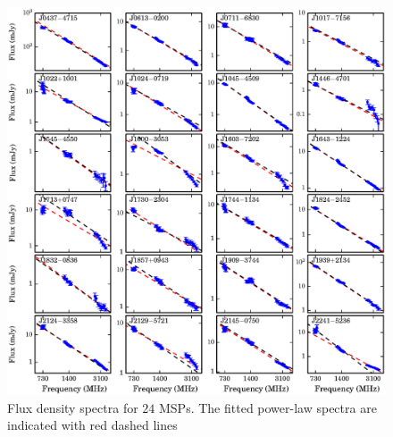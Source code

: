 \documentclass[useAMS,usenatbib]{mn2e}
\begin{document}
\begin{table}
\begin{tabular}{lccccccc}
\hline
\end{tabular}
\end{table}

\begin{figure}
\begin{center}
\includegraphics[width=6 in]{specIndex.ps}
\caption{Flux density spectra for $24$ MSPs. The fitted power-law spectra are 
indicated with red dashed lines} 
\label{index}
\end{center}
\end{figure}
\end{document}
